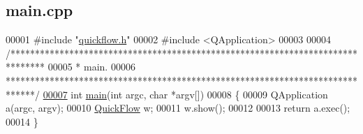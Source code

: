 \hypertarget{main_8cpp_source}{}\subsection{main.\+cpp}
\label{main_8cpp_source}

\begin{DoxyCode}
00001 \textcolor{preprocessor}{#include "\hyperlink{quickflow_8h}{quickflow.h}"}
00002 \textcolor{preprocessor}{#include <QApplication>}
00003 
00004 \textcolor{comment}{/*******************************************************************************}
00005 \textcolor{comment}{ * main.}
00006 \textcolor{comment}{ ******************************************************************************/}
\hypertarget{main_8cpp_source_l00007}{}\hyperlink{main_8cpp_a0ddf1224851353fc92bfbff6f499fa97}{00007} \textcolor{keywordtype}{int} \hyperlink{main_8cpp_a0ddf1224851353fc92bfbff6f499fa97}{main}(\textcolor{keywordtype}{int} argc, \textcolor{keywordtype}{char} *argv[])
00008 \{
00009   QApplication a(argc, argv);
00010   \hyperlink{class_quick_flow}{QuickFlow} w;
00011   w.show();
00012 
00013   \textcolor{keywordflow}{return} a.exec();
00014 \}
\end{DoxyCode}
